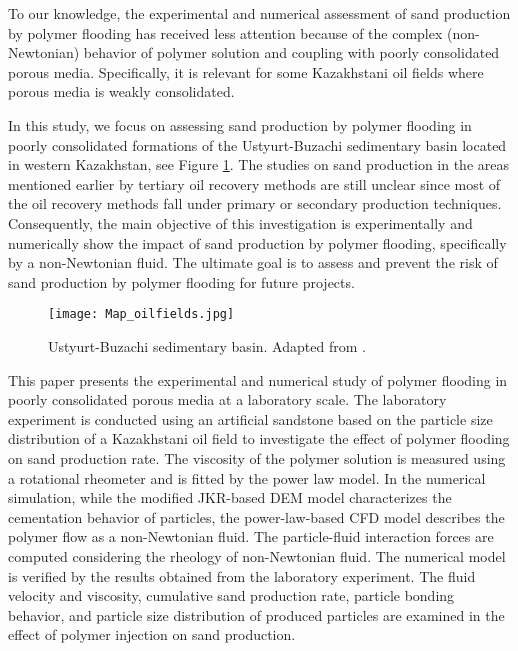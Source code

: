 \documentclass{article}
\begin{document}
{To our knowledge, the experimental and numerical assessment of sand production by polymer flooding has received less attention because of the complex (non-Newtonian) behavior of polymer solution and coupling with poorly consolidated porous media. Specifically, it is relevant for some Kazakhstani oil fields where porous media is weakly consolidated.

In this study, we focus on assessing sand production by polymer flooding in poorly consolidated formations of the Ustyurt-Buzachi sedimentary basin located in western Kazakhstan, see Figure \ref{fig:map}. The studies on sand production in the areas mentioned earlier by tertiary oil recovery methods are still unclear since most of the oil recovery methods fall under primary or secondary production techniques.  Consequently, the main objective of this investigation is experimentally and numerically show the impact of sand production by polymer flooding, specifically by a non-Newtonian fluid.  The ultimate goal is to assess and prevent the risk of sand production by polymer flooding for future projects.

\begin{figure}[H]
\begin{centering}
\texttt{[image: Map\_oilfields.jpg]}
\par\end{centering}
\caption{Ustyurt-Buzachi sedimentary basin. Adapted from \citep{iskaziyev2013complex}.\label{fig:map}}
\end{figure}

This paper presents the experimental and numerical study of polymer flooding in poorly consolidated porous media at a laboratory scale. The laboratory experiment is conducted using an artificial sandstone based on the particle size distribution of a Kazakhstani oil field to investigate the effect of polymer flooding on sand production rate. The viscosity of the polymer solution is measured using a rotational rheometer and is fitted by the power law model. In the numerical simulation, while the modified JKR-based DEM model characterizes the cementation behavior of particles, the power-law-based CFD model describes the polymer flow as a non-Newtonian fluid. The particle-fluid interaction forces are computed considering the rheology of non-Newtonian fluid. The numerical model is verified by the results obtained from the laboratory experiment. The fluid velocity and viscosity, cumulative sand production rate, particle bonding behavior, and particle size distribution of produced particles are examined in the effect of polymer injection on sand production.  

}
\end{document}
